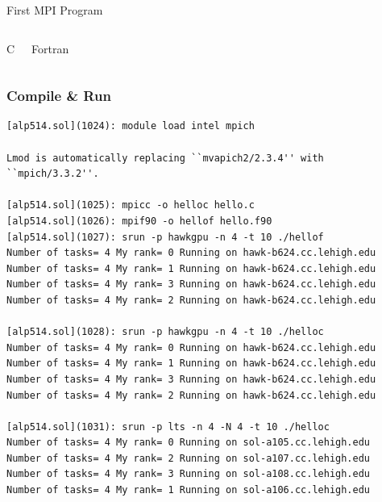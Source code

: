 \documentclass[9pt,c]{beamer}
\begin{document}
\begin{frame}{First MPI Program}
  \begin{columns}
    \vspace{-0.5cm}
    \begin{exampleblock}{C}
      
    \end{exampleblock}
    \vspace{-0.5cm}
    \begin{exampleblock}{Fortran}
      
    \end{exampleblock}
  \end{columns}
\end{frame}

\begin{frame}[fragile]
  \frametitle{Compile \& Run}
  \begin{exampleblock}{}
    \begin{lstlisting}[basicstyle=\scriptsize\ttfamily]
[alp514.sol](1024): module load intel mpich

Lmod is automatically replacing ``mvapich2/2.3.4'' with ``mpich/3.3.2''.

[alp514.sol](1025): mpicc -o helloc hello.c
[alp514.sol](1026): mpif90 -o hellof hello.f90
[alp514.sol](1027): srun -p hawkgpu -n 4 -t 10 ./hellof
Number of tasks= 4 My rank= 0 Running on hawk-b624.cc.lehigh.edu
Number of tasks= 4 My rank= 1 Running on hawk-b624.cc.lehigh.edu
Number of tasks= 4 My rank= 3 Running on hawk-b624.cc.lehigh.edu
Number of tasks= 4 My rank= 2 Running on hawk-b624.cc.lehigh.edu

[alp514.sol](1028): srun -p hawkgpu -n 4 -t 10 ./helloc
Number of tasks= 4 My rank= 0 Running on hawk-b624.cc.lehigh.edu
Number of tasks= 4 My rank= 1 Running on hawk-b624.cc.lehigh.edu
Number of tasks= 4 My rank= 3 Running on hawk-b624.cc.lehigh.edu
Number of tasks= 4 My rank= 2 Running on hawk-b624.cc.lehigh.edu

[alp514.sol](1031): srun -p lts -n 4 -N 4 -t 10 ./helloc
Number of tasks= 4 My rank= 0 Running on sol-a105.cc.lehigh.edu
Number of tasks= 4 My rank= 2 Running on sol-a107.cc.lehigh.edu
Number of tasks= 4 My rank= 3 Running on sol-a108.cc.lehigh.edu
Number of tasks= 4 My rank= 1 Running on sol-a106.cc.lehigh.edu
    \end{lstlisting}
  \end{exampleblock}
\end{frame}
\end{document}
